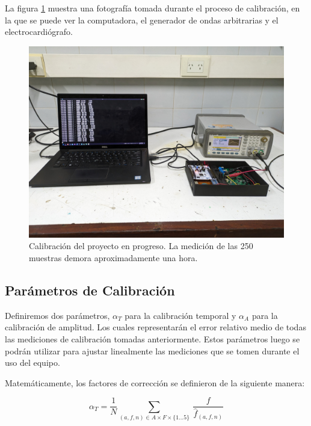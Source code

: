 \documentclass[conference]{IEEEtran}
\begin{document}
La figura \ref{fig:calibracion} muestra una fotografía tomada
durante el proceso de calibración, en la que se puede ver la computadora, el
generador de ondas arbitrarias y el electrocardiógrafo.

\begin{figure}[h]
    \centering
    \includegraphics[width=\linewidth]{figs/foto_calibracion.jpeg}
    \caption{Calibración del proyecto en progreso. La medición de las 250
    muestras demora aproximadamente una hora.}
    \label{fig:calibracion}

\end{figure}


\subsection{Parámetros de Calibración}

Definiremos dos parámetros, $\alpha_{T}$ para la calibración temporal y
$\alpha_{A}$ para la calibración de amplitud. Los cuales representarán
el error relativo medio de todas las mediciones de calibración tomadas
anteriormente.
Estos parámetros luego se podrán utilizar para ajustar linealmente las
mediciones que se tomen durante el uso del equipo.

Matemáticamente, los factores de corrección se definieron de la siguiente
manera: 


\begin{equation}
\alpha_{T} = \dfrac{1}{N} \sum_{(a,f,n) \in A \times F \times \{1...5 \}}
\nolimits ~ \frac{f}{\hat{f}_{(a,f,n)}}
\label{eqn:alpha_f}
\end{equation} 
\end{document}
